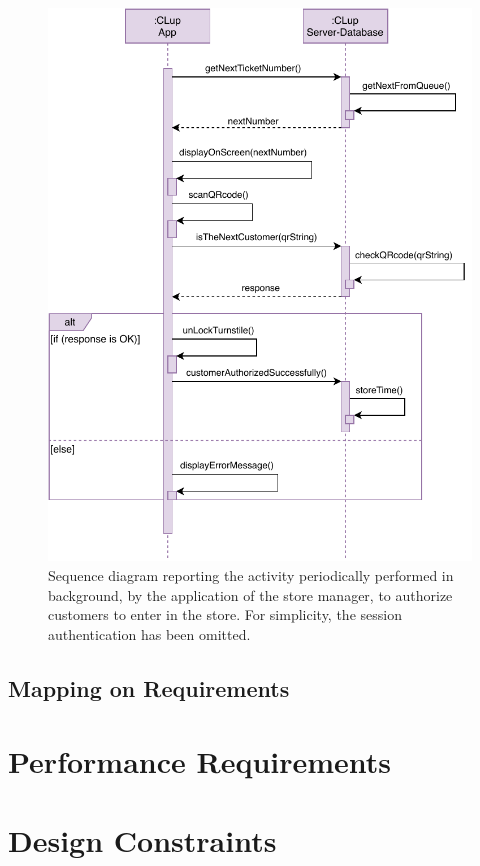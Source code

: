 \begin{figure}[H]
	\centering
	\includegraphics[width=1.0\textwidth]{images/authorizationToEnter_sequence_diagram.pdf}
	\caption{Sequence diagram reporting the activity periodically performed in background, by the application of the store manager, to authorize customers to enter in the store. For simplicity, the session authentication has been omitted.}
\end{figure}

\subsection{Mapping on Requirements}

\section{Performance Requirements}

\section{Design Constraints}

